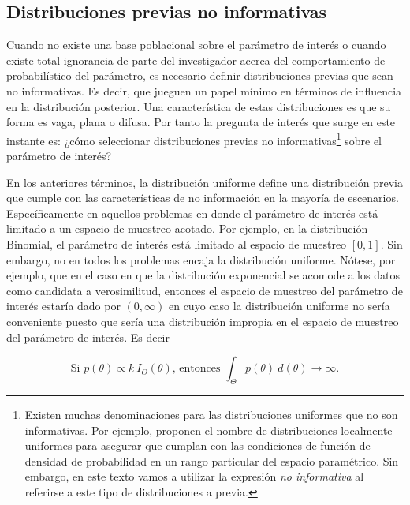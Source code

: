 \documentclass[
  spanish,
]{book}
\theoremstyle{definition}
\theoremstyle{definition}
\theoremstyle{definition}
\theoremstyle{remark}
\begin{document}
\hypertarget{distribuciones-previas-no-informativas}{%
\subsection{Distribuciones previas no informativas}\label{distribuciones-previas-no-informativas}}

Cuando no existe una base poblacional sobre el parámetro de interés o
cuando existe total ignorancia de parte del investigador acerca del
comportamiento de probabilístico del parámetro, es necesario definir
distribuciones previas que sean no informativas. Es decir, que jueguen un papel mínimo en términos de
influencia en la distribución posterior. Una característica de
estas distribuciones es que su forma es vaga, plana o difusa.
Por tanto la pregunta de interés que surge en este instante es: ¿cómo
seleccionar distribuciones previas no
informativas\footnote{Existen muchas denominaciones para las distribuciones uniformes que no son informativas. Por ejemplo, \citet{BoxTiao} proponen el nombre de distribuciones localmente uniformes para asegurar que cumplan con las condiciones de función de densidad de probabilidad en un rango particular del espacio paramétrico. Sin embargo, en este texto vamos a utilizar la expresión \emph{no informativa} al referirse a este tipo de distribuciones a previa.}
sobre el parámetro de interés?

En los anteriores términos, la distribución uniforme define una
distribución previa que cumple con las características de no
información en la mayoría de escenarios. Específicamente en aquellos
problemas en donde el parámetro de interés está limitado a un espacio de
muestreo acotado. Por ejemplo, en la distribución Binomial, el parámetro
de interés está limitado al espacio de muestreo \([0,1]\). Sin embargo, no
en todos los problemas encaja la distribución uniforme. Nótese, por
ejemplo, que en el caso en que la distribución exponencial se acomode a
los datos como candidata a verosimilitud, entonces el espacio de
muestreo del parámetro de interés estaría dado por \((0,\infty)\) en cuyo
caso la distribución uniforme no sería conveniente puesto que sería una
distribución impropia en el espacio de muestreo del parámetro de
interés. Es decir

\begin{equation*}
\text{Si } p(\theta)\propto k\ I_{\Theta}(\theta) \text{, entonces } \int_{\Theta}p(\theta) \ d(\theta)\longrightarrow \infty.
\end{equation*}
\end{document}
